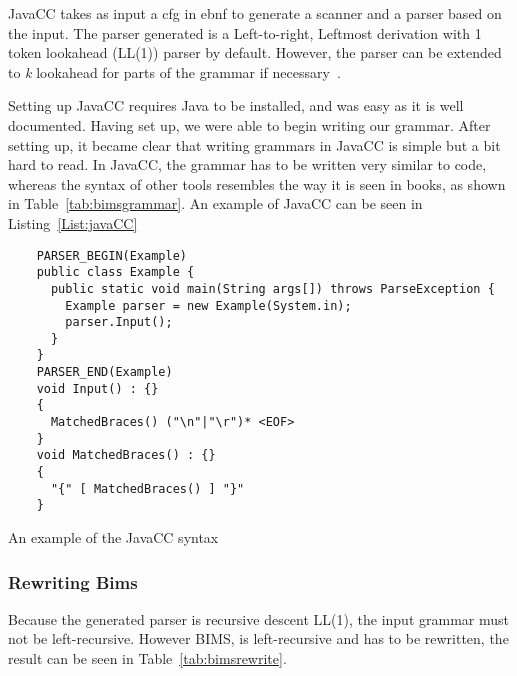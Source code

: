 JavaCC takes as input a \gls{cfg} in \gls{ebnf} to generate a scanner and a parser based on the input. The parser generated is a Left-to-right, Leftmost derivation with 1 token lookahead (LL(1)) parser by default. However, the parser can be extended to \textit{k} lookahead for parts of the grammar if necessary~\cite{JavaCC2021}.

Setting up JavaCC requires Java to be installed, and was easy as it is well documented. Having set up, we were able to begin writing our grammar. After setting up, it became clear that writing grammars in JavaCC is simple but a bit hard to read. In JavaCC, the grammar has to be written very similar to code, whereas the syntax of other tools resembles the way it is seen in books, as shown in Table~\ref{tab:bimsgrammar}. An example of JavaCC can be seen in Listing~\ref{List:javaCC}


\begin{listing}[htb!]
  \centering
  \begin{verbatim}
    PARSER_BEGIN(Example)
    public class Example {
      public static void main(String args[]) throws ParseException {
        Example parser = new Example(System.in);
        parser.Input();
      }
    }
    PARSER_END(Example)
    void Input() : {}
    {
      MatchedBraces() ("\n"|"\r")* <EOF>
    }
    void MatchedBraces() : {}
    {
      "{" [ MatchedBraces() ] "}"
    }
\end{verbatim}
  \caption{An example of the JavaCC syntax}
  \label{List:javaCC}
\end{listing}


\subsubsection{Rewriting Bims}
Because the generated parser is recursive descent LL(1), the input grammar must not be left-recursive. However BIMS, is left-recursive and has to be rewritten, the result can be seen in Table~\ref{tab:bimsrewrite}.


